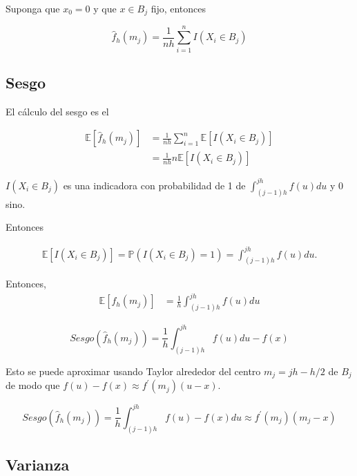 \documentclass[
  12pt,
]{book}
\theoremstyle{definition}
\theoremstyle{definition}
\theoremstyle{definition}
\theoremstyle{remark}
\begin{document}
Suponga que \(x_0 = 0\) y que \(x \in B_j\) fijo, entonces

\begin{equation*}
\hat{f}_h(m_j) =  \frac{1}{nh} \sum_{i = 1}^{n} I(X_i \in B_j)
\end{equation*}

\hypertarget{sesgo}{%
\subsection{Sesgo}\label{sesgo}}

El cálculo del sesgo es el

\begin{align*}
\mathbb{E}\left[ \hat{f}_h(m_j)\right]
& =  \frac{1}{nh} \sum_{i = 1}^{n} \mathbb{E}\left[ I(X_i \in B_j)\right] \\
& = \frac{1}{nh} n \mathbb{E}\left[ I(X_i \in B_j)\right]
\end{align*}

\(I(X_i \in B_j)\) es una indicadora con probabilidad de 1 de \(\int_{(j - 1)h}^{jh} f(u)du\) y 0 sino.

Entonces

\begin{align*}
\mathbb{E}\left[ I(X_i \in B_j)\right] = \mathbb{P}\left(I(X_i \in
B_j)=1\right) = \int_{(j - 1)h}^{jh} f(u)du.
\end{align*}

Entonces,
\begin{align*}
\mathbb{E}\left[{f}_h(m_j)\right]
& = \frac{1}{h} \int_{(j - 1)h}^{jh} f(u)du
\end{align*}

\begin{equation*}
Sesgo(\hat{f}_h(m_j)) = \frac{1}{h} \int_{(j -
1)h}^{jh} f(u)du - f(x)
\end{equation*}

Esto se puede aproximar usando Taylor alrededor del centro \(m_j = jh - h/2\) de \(B_j\) de modo que \(f(u) - f(x) \approx f^{\prime}(m_j)(u - x)\).

\begin{equation*}
Sesgo(\hat{f}_h(m_j)) =  \frac{1}{h} \int_{(j -
1)h}^{jh} f(u) - f(x) du \approx f^\prime(m_j)(m_j - x)
\end{equation*}

\hypertarget{varianza}{%
\subsection{Varianza}\label{varianza}}
\end{document}
